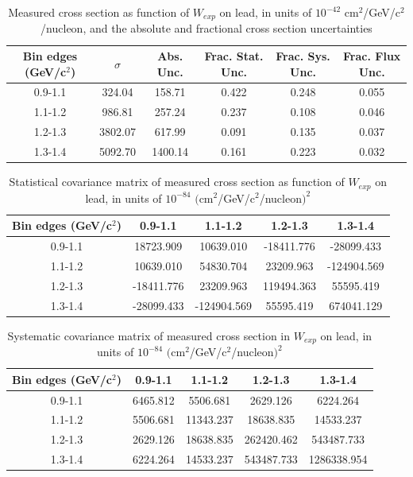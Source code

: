 \documentclass[../main.tex]{subfiles}
\begin{document}
\pagebreak
\begin{turnpage}
\end{turnpage}
\begin{table}
  \centering
  \renewcommand{\arraystretch}{1.15}
  \caption{Measured cross section as function of $W_{exp}$ on lead, in units of $10^{-42}$ $\text{cm}^2$/GeV/c${}^2$/nucleon, and the absolute and fractional cross section uncertainties}
    \begin{tabular}{c||c|c||c|c|c}
      Bin edges (GeV/c${}^2$) &  $\sigma$  &  Abs. Unc.  &  Frac. Stat. Unc.  &  Frac. Sys. Unc.  &  Frac. Flux Unc. \\
      \hline
      \hline
      0.9-1.1 & 324.04 & 158.71 & 0.422 & 0.248 & 0.055\\
      1.1-1.2 & 986.81 & 257.24 & 0.237 & 0.108 & 0.046\\
      1.2-1.3 & 3802.07 & 617.99 & 0.091 & 0.135 & 0.037\\
      1.3-1.4 & 5092.70 & 1400.14 & 0.161 & 0.223 & 0.032
    \end{tabular}
  \label{tbl:datanucleonnuc82Wa}
\end{table}
\begin{table}
  \centering
  \renewcommand{\arraystretch}{1.15}
  \caption{Statistical covariance matrix of measured cross section as function of $W_{exp}$ on lead, in units of $10^{-84}$ $(\text{cm}^2$/GeV/c${}^2$/nucleon$)^2$}
    \begin{tabular}{c||cccc}
      Bin edges (GeV/c${}^2$) & 0.9-1.1 & 1.1-1.2 & 1.2-1.3 & 1.3-1.4\\
      \hline
      \hline
      0.9-1.1 & 18723.909 & 10639.010 & -18411.776 & -28099.433\\
      1.1-1.2 & 10639.010 & 54830.704 & 23209.963 & -124904.569\\
      1.2-1.3 & -18411.776 & 23209.963 & 119494.363 & 55595.419\\
      1.3-1.4 & -28099.433 & -124904.569 & 55595.419 & 674041.129
    \end{tabular}
  \label{tbl:statnucleonnuc82Wb}
\end{table}
\begin{table}
  \centering
  \renewcommand{\arraystretch}{1.15}
  \caption{Systematic covariance matrix of measured cross section in $W_{exp}$ on lead, in units of $10^{-84}$ $(\text{cm}^2$/GeV/c${}^2$/nucleon$)^2$}
    \begin{tabular}{c||cccc}
      Bin edges (GeV/c${}^2$) & 0.9-1.1 & 1.1-1.2 & 1.2-1.3 & 1.3-1.4\\
      \hline
      \hline
      0.9-1.1 & 6465.812 & 5506.681 & 2629.126 & 6224.264\\
      1.1-1.2 & 5506.681 & 11343.237 & 18638.835 & 14533.237\\
      1.2-1.3 & 2629.126 & 18638.835 & 262420.462 & 543487.733\\
      1.3-1.4 & 6224.264 & 14533.237 & 543487.733 & 1286338.954
    \end{tabular}
  \label{tbl:sysnucleonnuc82Wc}
\end{table}
\end{document}
